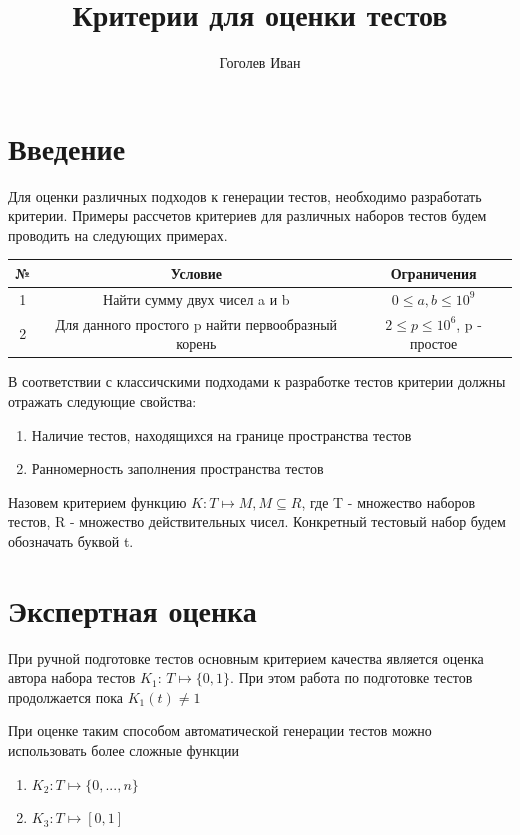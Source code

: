 \documentclass{article}
\begin{document}
\author{Гоголев Иван}
\title{Критерии для оценки тестов}
\maketitle
\tableofcontents
\section{Введение}
    Для оценки различных подходов к генерации тестов, необходимо разработать критерии. Примеры рассчетов критериев
    для различных наборов тестов будем проводить на следующих примерах.

\begin{tabular}{|c|c|c|}
\hline
№ & Условие & Ограничения \\
\hline
1 & Найти сумму двух чисел a и b & \( 0 \leq a,b \leq 10^9\) \\
\hline
2 & Для данного простого p найти первообразный корень & \( 2 \leq p \leq 10^6\), p - простое \\
\hline
\end{tabular}

    В соответствии с классичскими подходами к разработке тестов критерии должны отражать следующие свойства:
\begin{enumerate}
\item Наличие тестов, находящихся на границе пространства тестов
\item Ранномерность заполнения пространства тестов
\end{enumerate}

Назовем критерием функцию \(K: T \mapsto M, M \subseteq R \), где T - множество наборов тестов, R - множество
действительных чисел. Конкретный тестовый набор будем обозначать буквой t.



\section{Экспертная оценка}
    При ручной подготовке тестов основным критерием качества является оценка автора набора тестов \(K_1\):
    \( T \mapsto \{ 0, 1 \}  \). При этом работа по подготовке тестов продолжается пока \(K_1(t) \neq 1\)

    При оценке таким способом автоматической генерации тестов можно использовать более сложные функции
\begin{enumerate}
\item \(K_2 : T \mapsto \{ 0,..., n \}  \)
\item \(K_3 : T \mapsto [0, 1]   \)
\end{enumerate}
\end{document}
